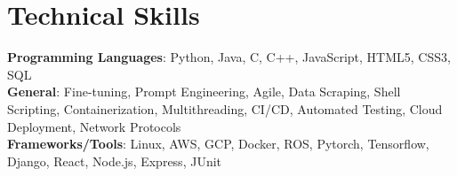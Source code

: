 \documentclass[letterpaper,11pt]{article}
\makeatletter
\newcommand{\resumeItem}[1]{
  \item\small{
    {#1 \vspace{-3pt}}
  }
}
\newcommand{\resumeSubSubheading}[2]{
    \item
    \begin{tabular*}{0.97\textwidth}{l@{\extracolsep{\fill}}r}
      \textit{\small#1} & \textit{\small #2} \\
    \end{tabular*}\vspace{-7pt}
}
\newcommand{\resumeSubHeadingListEnd}{\end{itemize}}
\newcommand{\resumeItemListStart}{\begin{itemize}}
\newcommand{\resumeItemListEnd}{\end{itemize}\vspace{-5pt}}
\makeatother
\begin{document}


\section{Technical Skills}
\begin{itemize}[leftmargin=0.15in, label={}]
  \small{\item{
        \textbf{Programming Languages}{: Python, Java, C, C++, JavaScript, HTML5, CSS3, SQL} \\
        \textbf{General}{: Fine-tuning, Prompt Engineering, Agile, Data Scraping, Shell Scripting, Containerization, Multithreading, CI/CD, Automated Testing, Cloud Deployment, Network Protocols} \\
        \textbf{Frameworks/Tools}{: Linux, AWS, GCP, Docker, ROS, Pytorch, Tensorflow, Django, React, Node.js, Express, JUnit}
        }}
\end{itemize}


\end{document}
